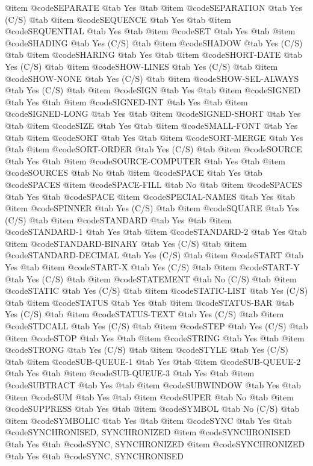 @item @code{SEPARATE} @tab Yes @tab 
@item @code{SEPARATION} @tab Yes	(C/S) @tab 
@item @code{SEQUENCE} @tab Yes @tab 
@item @code{SEQUENTIAL} @tab Yes @tab 
@item @code{SET} @tab Yes @tab 
@item @code{SHADING} @tab Yes	(C/S) @tab 
@item @code{SHADOW} @tab Yes	(C/S) @tab 
@item @code{SHARING} @tab Yes @tab 
@item @code{SHORT-DATE} @tab Yes	(C/S) @tab 
@item @code{SHOW-LINES} @tab Yes	(C/S) @tab 
@item @code{SHOW-NONE} @tab Yes	(C/S) @tab 
@item @code{SHOW-SEL-ALWAYS} @tab Yes	(C/S) @tab 
@item @code{SIGN} @tab Yes @tab 
@item @code{SIGNED} @tab Yes @tab 
@item @code{SIGNED-INT} @tab Yes @tab 
@item @code{SIGNED-LONG} @tab Yes @tab 
@item @code{SIGNED-SHORT} @tab Yes @tab 
@item @code{SIZE} @tab Yes @tab 
@item @code{SMALL-FONT} @tab Yes @tab 
@item @code{SORT} @tab Yes @tab 
@item @code{SORT-MERGE} @tab Yes @tab 
@item @code{SORT-ORDER} @tab Yes	(C/S) @tab 
@item @code{SOURCE} @tab Yes @tab 
@item @code{SOURCE-COMPUTER} @tab Yes @tab 
@item @code{SOURCES} @tab No @tab 
@item @code{SPACE} @tab Yes @tab @code{SPACES}
@item @code{SPACE-FILL} @tab No @tab 
@item @code{SPACES} @tab Yes @tab @code{SPACE}
@item @code{SPECIAL-NAMES} @tab Yes @tab 
@item @code{SPINNER} @tab Yes	(C/S) @tab 
@item @code{SQUARE} @tab Yes	(C/S) @tab 
@item @code{STANDARD} @tab Yes @tab 
@item @code{STANDARD-1} @tab Yes @tab 
@item @code{STANDARD-2} @tab Yes @tab 
@item @code{STANDARD-BINARY} @tab Yes	(C/S) @tab 
@item @code{STANDARD-DECIMAL} @tab Yes	(C/S) @tab 
@item @code{START} @tab Yes @tab 
@item @code{START-X} @tab Yes	(C/S) @tab 
@item @code{START-Y} @tab Yes	(C/S) @tab 
@item @code{STATEMENT} @tab No	(C/S) @tab 
@item @code{STATIC} @tab Yes	(C/S) @tab 
@item @code{STATIC-LIST} @tab Yes	(C/S) @tab 
@item @code{STATUS} @tab Yes @tab 
@item @code{STATUS-BAR} @tab Yes	(C/S) @tab 
@item @code{STATUS-TEXT} @tab Yes	(C/S) @tab 
@item @code{STDCALL} @tab Yes	(C/S) @tab 
@item @code{STEP} @tab Yes	(C/S) @tab 
@item @code{STOP} @tab Yes @tab 
@item @code{STRING} @tab Yes @tab 
@item @code{STRONG} @tab Yes	(C/S) @tab 
@item @code{STYLE} @tab Yes	(C/S) @tab 
@item @code{SUB-QUEUE-1} @tab Yes @tab 
@item @code{SUB-QUEUE-2} @tab Yes @tab 
@item @code{SUB-QUEUE-3} @tab Yes @tab 
@item @code{SUBTRACT} @tab Yes @tab 
@item @code{SUBWINDOW} @tab Yes @tab 
@item @code{SUM} @tab Yes @tab 
@item @code{SUPER} @tab No @tab 
@item @code{SUPPRESS} @tab Yes @tab 
@item @code{SYMBOL} @tab No	(C/S) @tab 
@item @code{SYMBOLIC} @tab Yes @tab 
@item @code{SYNC} @tab Yes @tab @code{SYNCHRONISED, SYNCHRONIZED}
@item @code{SYNCHRONISED} @tab Yes @tab @code{SYNC, SYNCHRONIZED}
@item @code{SYNCHRONIZED} @tab Yes @tab @code{SYNC, SYNCHRONISED}
